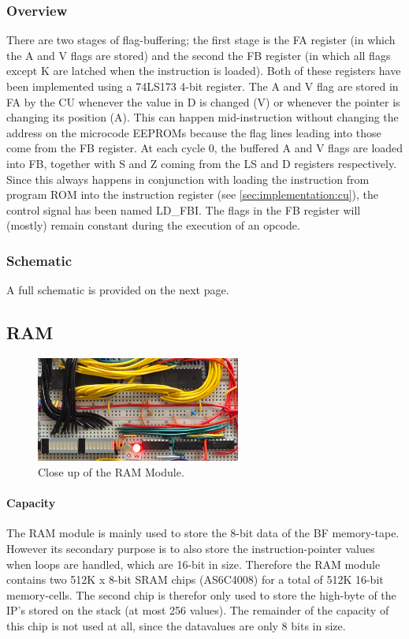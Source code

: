 \subsubsection{Overview}
There are two stages of flag-buffering; the first stage is the FA register (in which the A and V flags are stored) and the second the FB register (in which all flags except K are latched when the instruction is loaded). Both of these registers have been implemented using a 74LS173 4-bit register. The A and V flag are stored in FA by the CU whenever the value in D is changed (V) or whenever the pointer is changing its position (A). This can happen mid-instruction without changing the address on the microcode EEPROMs because the flag lines leading into those come from the FB register. At each cycle 0, the buffered A and V flags are loaded into FB, together with S and Z coming from the LS and D registers respectively. Since this always happens in conjunction with loading the instruction from program ROM into the instruction register (see \ref{sec:implementation:cu}), the control signal has been named LD\_FBI. The flags in the FB register will (mostly) remain constant during the execution of an opcode.

\subsubsection{Schematic}
A full schematic is provided on the next page.




\subsection{RAM}
\begin{figure}[H]
  \centering
  \includegraphics[width=0.6\textwidth]{img/ramcloseup}
  \caption{Close up of the RAM Module.}
  \label{fig:ramcloseup}
\end{figure}

\paragraph{Capacity} The RAM module is mainly used to store the 8-bit data of the BF memory-tape. However its secondary purpose is to also store the instruction-pointer values when loops are handled, which are 16-bit in size. Therefore the RAM module contains two 512K x 8-bit SRAM chips (AS6C4008) for a total of 512K 16-bit memory-cells. The second chip is therefor only used to store the high-byte of the IP's stored on the stack (at most 256 values). The remainder of the capacity of this chip is not used at all, since the datavalues are only 8 bits in size.

